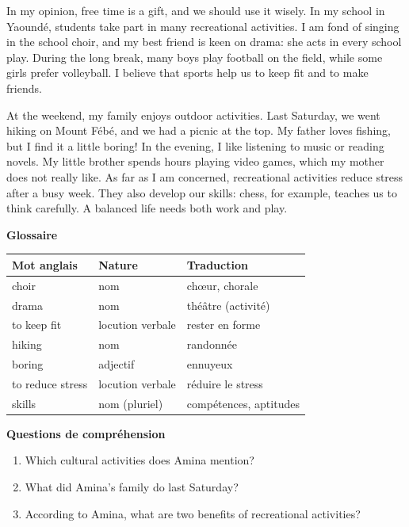 \documentclass[11pt]{article}
\begin{document}
\begin{textebox}
In my opinion, free time is a gift, and we should use it wisely. In my school in Yaoundé, students take part in many recreational activities. I am fond of singing in the school choir, and my best friend is keen on drama: she acts in every school play. During the long break, many boys play football on the field, while some girls prefer volleyball. I believe that sports help us to keep fit and to make friends.

At the weekend, my family enjoys outdoor activities. Last Saturday, we went hiking on Mount Fébé, and we had a picnic at the top. My father loves fishing, but I find it a little boring! In the evening, I like listening to music or reading novels. My little brother spends hours playing video games, which my mother does not really like. As far as I am concerned, recreational activities reduce stress after a busy week. They also develop our skills: chess, for example, teaches us to think carefully. A balanced life needs both work and play.
\end{textebox}

\textbf{Glossaire}

\begin{center}
\begin{tabularx}{\linewidth}{|l|l|X|}
\hline
\rowcolor{popblueL} Mot anglais & Nature & Traduction \\
\hline
choir & nom & chœur, chorale \\
\hline
drama & nom & théâtre (activité) \\
\hline
to keep fit & locution verbale & rester en forme \\
\hline
hiking & nom & randonnée \\
\hline
boring & adjectif & ennuyeux \\
\hline
to reduce stress & locution verbale & réduire le stress \\
\hline
skills & nom (pluriel) & compétences, aptitudes \\
\hline
\end{tabularx}
\end{center}

\textbf{Questions de compréhension}
\begin{enumerate}
\item Which cultural activities does Amina mention?
\item What did Amina's family do last Saturday?
\item According to Amina, what are two benefits of recreational activities?
\end{enumerate}
\end{document}
